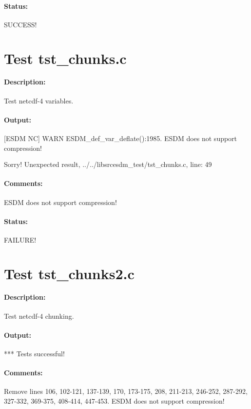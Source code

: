 \paragraph{Status:} SUCCESS!

\section{Test tst\_chunks.c}

\paragraph{Description:} Test netcdf-4 variables.

\paragraph{Output:} [ESDM NC] WARN ESDM\_def\_var\_deflate():1985. ESDM does not support compression!

Sorry! Unexpected result, ../../libsrcesdm\_test/tst\_chunks.c, line: 49

\paragraph{Comments:} ESDM does not support compression!

\paragraph{Status:} FAILURE!

\section{Test tst\_chunks2.c}

\paragraph{Description:} Test netcdf-4 chunking.

\paragraph{Output:} *** Tests successful!

\paragraph{Comments:} Remove lines 106, 102-121, 137-139, 170, 173-175, 208, 211-213, 246-252, 287-292, 327-332, 369-375, 408-414, 447-453. ESDM does not support compression!

